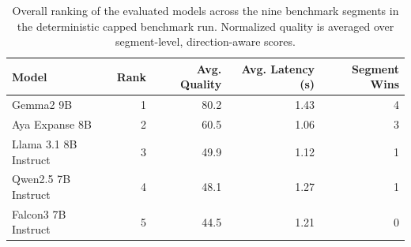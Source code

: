 \begin{table}[t]
\centering
\caption{Overall ranking of the evaluated models across the nine benchmark segments in the deterministic capped benchmark run. Normalized quality is averaged over segment-level, direction-aware scores.}
\label{tab:capped-overall-ranking}
\begin{tabular}{lrrrr}
\toprule
Model & Rank & Avg. Quality & Avg. Latency (s) & Segment Wins \\
\midrule
Gemma2 9B & 1 & 80.2 & 1.43 & 4 \\
Aya Expanse 8B & 2 & 60.5 & 1.06 & 3 \\
Llama 3.1 8B Instruct & 3 & 49.9 & 1.12 & 1 \\
Qwen2.5 7B Instruct & 4 & 48.1 & 1.27 & 1 \\
Falcon3 7B Instruct & 5 & 44.5 & 1.21 & 0 \\
\bottomrule
\end{tabular}
\end{table}
